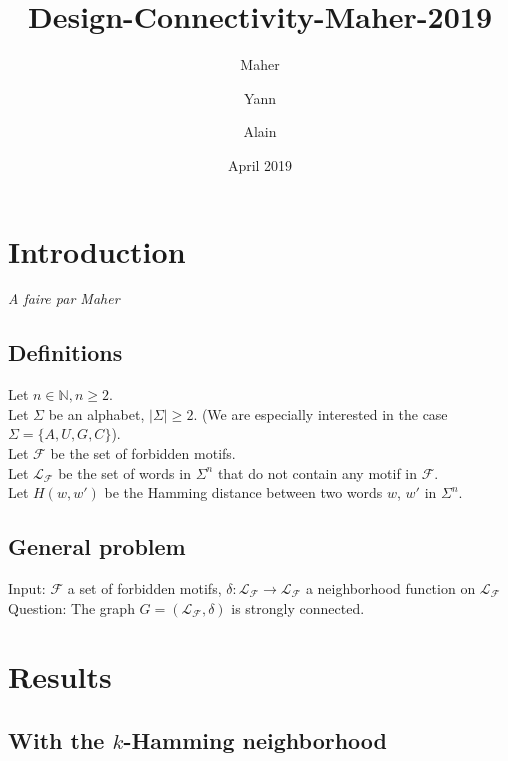 \documentclass{article}
\title{Design-Connectivity-Maher-2019}
\author{Maher \and Yann \and Alain}
\date{April 2019}
\begin{document}
	
	\maketitle
	
	\newtheorem{theorem}{Theorem}
	\newtheorem{result}[theorem]{Result}
	\newtheorem{corollary}[theorem]{Corollary}
	
	\newcommand{\Nat}{\mathbb{N}}
	\newcommand{\PosInt}{\mathbb{N}^*}
	\newcommand{\Forb}{\mathcal{F}}
	\newcommand{\Lang}[1]{\mathcal{L}_{#1}}
	\newcommand{\Hamming}[2]{H(#1,#2)}
	
	
	
	\section{Introduction}
	{\it A faire par Maher}
	
	\subsection*{Definitions}
	
	Let $n \in \Nat, n \geq 2$. \\
	Let $\Sigma$ be an alphabet, $|\Sigma| \geq 2$. (We are especially interested in the case $\Sigma = \{A, U, G, C\}$). \\
	Let $\Forb$ be the set of forbidden motifs. \\
	Let $\Lang{\Forb}$ be the set of words in $\Sigma^n$ that do not contain any motif in $\Forb$. \\
	Let $H(w,w')$ be the Hamming distance between two words $w$, $w'$ in $\Sigma^n$.
	
	\subsection*{General problem}
	
	Input: $\Forb$ a set of forbidden motifs, $\delta: \Lang{\Forb} \rightarrow \Lang{\Forb}$ a neighborhood function on $\Lang{\Forb}$ \\
	Question: The graph $G = (\Lang{\Forb}, \delta)$ is strongly connected.
	
	\section{Results}
	\subsection{With the $k$-Hamming neighborhood}
	
\end{document}
